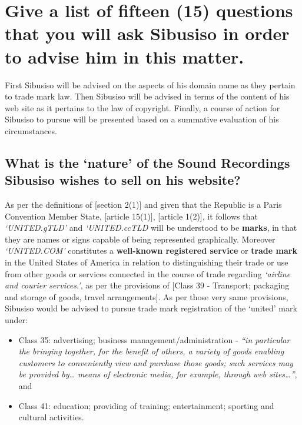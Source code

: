 \documentclass[11pt]{article}
\begin{document}
\section{Give a list of fifteen (15) questions that you will ask Sibusiso in order to advise him in this matter.}
\label{sec:org05c4ce7}
First Sibusiso will be advised on the aspects of his domain name as they pertain
to trade mark law. Then Sibusiso will be advised in terms of the content of his
web site as it pertains to the law of copyright. Finally, a course of action for
Sibusiso to pursue will be presented based on a summative evaluation
of his circumstances.
\subsection{What is the `nature' of the Sound Recordings Sibusiso wishes to sell on his website?}
\label{sec:org3e0902b}
As per the definitions of [section 2(1)]\cite{rsa93_tm_act} and given that the
Republic is a Paris Convention Member State, [article 15(1)]\cite{wto17_trips},
[article 1(2)]\cite{wipo83_paris_conve_protect_ip}, it follows that
\emph{`UNITED.gTLD'} and \emph{`UNITED.ccTLD} will be understood to be \textbf{marks}, in that
they are names or signs capable of being represented graphically. Moreover
\emph{`UNITED.COM'} constitutes a \textbf{well-known registered service} or \textbf{trade mark} in
the United States of America in relation to distinguishing their trade or use
from other goods or services connected in the course of trade regarding
\emph{`airline and courier services.'}, as per the provisions of [Class 39 -
Transport; packaging and storage of goods, travel
arrangements]\cite{wipo57_ncl}. As per those very same provisions, Sibusiso would be advised to pursue
trade mark registration of the `united' mark under:
\begin{itemize}
\item Class 35: advertising; business management/administration - \emph{``in particular the bringing together, for the benefit of others, a variety of goods enabling customers to conveniently view and purchase those goods; such services may be provided by\ldots{} means of electronic media, for example, through web sites\ldots{}''}, and
\item Class 41: education; providing of training; entertainment; sporting and
cultural activities.
\end{itemize}
\end{document}
